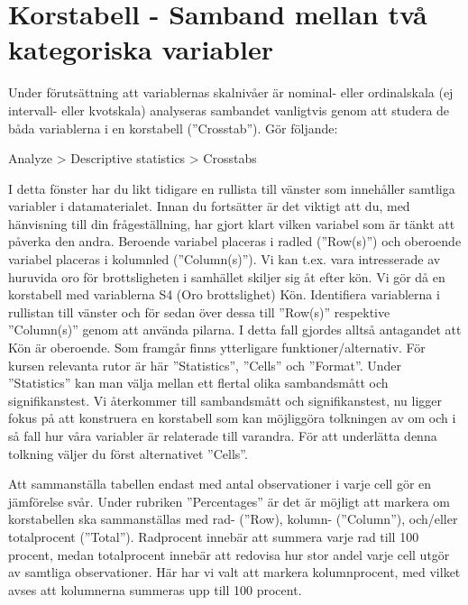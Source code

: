 \documentclass[
]{book}
\begin{document}
\hypertarget{korstabell---samband-mellan-tvuxe5-kategoriska-variabler}{%
\section{Korstabell - Samband mellan två kategoriska variabler}\label{korstabell---samband-mellan-tvuxe5-kategoriska-variabler}}

Under förutsättning att variablernas skalnivåer är nominal- eller ordinalskala (ej intervall- eller
kvotskala) analyseras sambandet vanligtvis genom att studera de båda variablerna i en korstabell (''Crosstab''). Gör följande:

Analyze \textgreater{} Descriptive statistics \textgreater{} Crosstabs

I detta fönster har du likt tidigare en rullista till vänster som innehåller samtliga variabler i
datamaterialet. Innan du fortsätter är det viktigt att du, med hänvisning till din frågeställning, har gjort klart vilken variabel som är tänkt att påverka den andra. Beroende variabel placeras i radled (''Row(s)'') och oberoende variabel placeras i kolumnled (''Column(s)''). Vi kan t.ex. vara intresserade av huruvida oro för brottsligheten i samhället skiljer sig åt efter kön. Vi gör då en korstabell med variablerna S4 (Oro brottslighet) Kön. Identifiera variablerna i rullistan till vänster och för sedan över dessa till ''Row(s)'' respektive ''Column(s)'' genom att använda pilarna. I detta fall gjordes alltså antagandet att Kön är
oberoende. Som framgår finns ytterligare funktioner/alternativ. För kursen relevanta rutor är här
''Statistics'', ''Cells'' och ''Format''. Under ''Statistics'' kan man välja mellan ett flertal olika
sambandsmått och signifikanstest. Vi återkommer till sambandsmått och signifikanstest, nu ligger
fokus på att konstruera en korstabell som kan möjliggöra tolkningen av om och i så fall hur våra
variabler är relaterade till varandra. För att underlätta denna tolkning väljer du först alternativet
''Cells''.

Att sammanställa tabellen endast med antal observationer i varje cell gör en jämförelse svår. Under
rubriken ''Percentages'' är det är möjligt att markera om korstabellen ska sammanställas med rad-
(''Row), kolumn- (''Column''), och/eller totalprocent (''Total''). Radprocent innebär att summera
varje rad till 100 procent, medan totalprocent innebär att redovisa hur stor andel varje cell utgör av
samtliga observationer. Här har vi valt att markera kolumnprocent, med vilket avses att kolumnerna
summeras upp till 100 procent.
\end{document}
